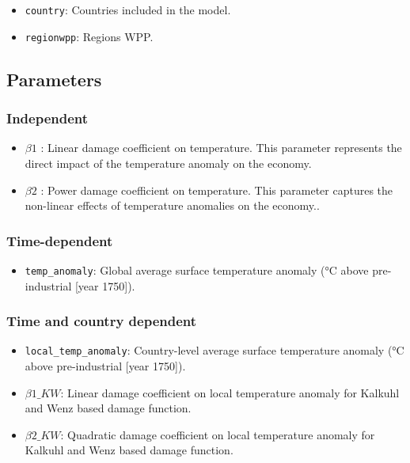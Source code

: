 \documentclass[
]{article}
\providecommand{\tightlist}{%
  \setlength{\itemsep}{0pt}\setlength{\parskip}{0pt}}
\begin{document}
\begin{itemize}
\tightlist
\item
  \texttt{country}: Countries included in the model.
\item
  \texttt{regionwpp}: Regions WPP.
\end{itemize}

\subsection{Parameters}\label{parameters-1}

\subsubsection{Independent}\label{independent-1}

\begin{itemize}
\tightlist
\item
  \(\beta1\) : Linear damage coefficient on temperature. This parameter
  represents the direct impact of the temperature anomaly on the
  economy.
\item
  \(\beta2\) : Power damage coefficient on temperature. This parameter
  captures the non-linear effects of temperature anomalies on the
  economy..
\end{itemize}

\subsubsection{Time-dependent}\label{time-dependent-2}

\begin{itemize}
\tightlist
\item
  \texttt{temp\_anomaly}: Global average surface temperature anomaly (°C
  above pre-industrial {[}year 1750{]}).
\end{itemize}

\subsubsection{Time and country
dependent}\label{time-and-country-dependent-2}

\begin{itemize}
\tightlist
\item
  \texttt{local\_temp\_anomaly}: Country-level average surface
  temperature anomaly (°C above pre-industrial {[}year 1750{]}).
\item
  \(\beta1\_{KW}\): Linear damage coefficient on local temperature
  anomaly for Kalkuhl and Wenz based damage function.
\item
  \(\beta2\_{KW}\): Quadratic damage coefficient on local temperature
  anomaly for Kalkuhl and Wenz based damage function.
\end{itemize}
\end{document}
